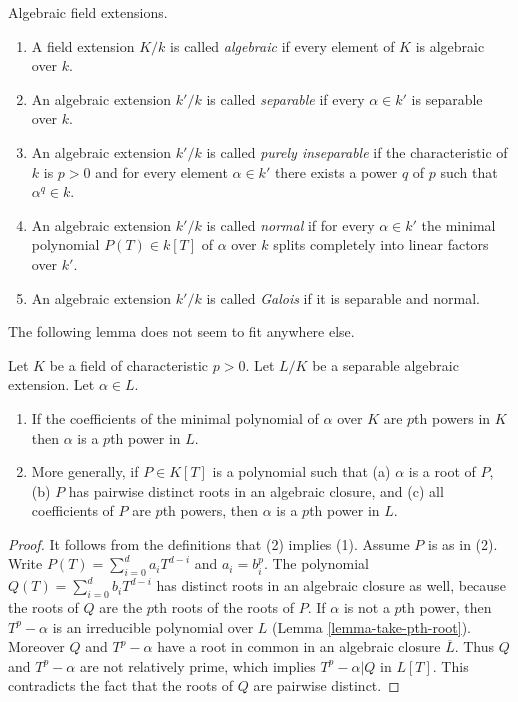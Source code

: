 \begin{definition}
\label{definition-separable-algebraic}
Algebraic field extensions.
\begin{enumerate}
\item A field extension $K/k$ is called {\it algebraic}
if every element of $K$ is algebraic over $k$.
\item An algebraic extension $k'/k$ is called {\it separable}
if every $\alpha \in k'$ is separable over $k$.
\item An algebraic
extension $k'/k$ is called {\it purely inseparable} if
the characteristic of $k$ is $p > 0$ and for every element
$\alpha \in k'$ there exists a power $q$ of $p$ such that
$\alpha^q \in k$.
\item An algebraic extension $k'/k$ is called {\it normal}
if for every $\alpha \in k'$ the minimal polynomial $P(T) \in k[T]$
of $\alpha$ over $k$ splits completely into linear factors over $k'$.
\item An algebraic extension $k'/k$ is called {\it Galois}
if it is separable and normal.
\end{enumerate}
\end{definition}

\noindent
The following lemma does not seem to fit anywhere else.

\begin{lemma}
\label{lemma-pth-root}
Let $K$ be a field of characteristic $p > 0$. Let $L/K$ be a separable
algebraic extension. Let $\alpha \in L$.
\begin{enumerate}
\item If the coefficients of the minimal polynomial of $\alpha$
over $K$ are $p$th powers in $K$ then $\alpha$ is a $p$th
power in $L$.
\item More generally, if $P \in K[T]$ is a polynomial such that (a) $\alpha$
is a root of $P$, (b) $P$ has pairwise distinct roots in an algebraic closure,
and (c) all coefficients of $P$ are $p$th powers, then $\alpha$ is a
$p$th power in $L$.
\end{enumerate}
\end{lemma}

\begin{proof}
It follows from the definitions that (2) implies (1). Assume $P$ is as in (2).
Write $P(T) = \sum\nolimits_{i = 0}^d a_i T^{d - i}$ and $a_i = b_i^p$.
The polynomial $Q(T) = \sum\nolimits_{i = 0}^d b_i T^{d - i}$ has distinct
roots in an algebraic closure as well, because the roots of $Q$
are the $p$th roots of the roots of $P$. If $\alpha$ is not a $p$th power,
then $T^p - \alpha$ is an irreducible polynomial over $L$
(Lemma \ref{lemma-take-pth-root}).
Moreover $Q$ and $T^p - \alpha$ have a root in common in
an algebraic closure $\overline{L}$.
Thus $Q$ and $T^p - \alpha$ are not relatively prime, which
implies $T^p - \alpha | Q$ in $L[T]$. This contradicts the fact that
the roots of $Q$ are pairwise distinct.
\end{proof}


















